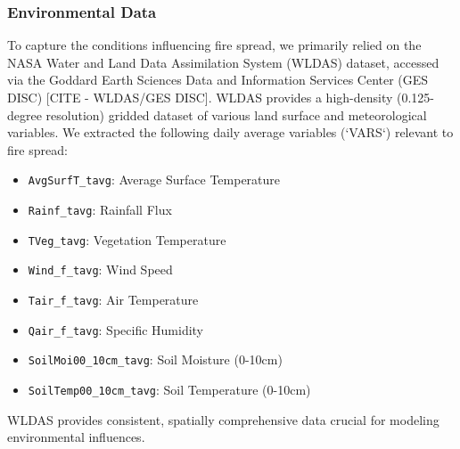 \documentclass[conference]{IEEEtran}
\begin{document}
\subsubsection{Environmental Data}
To capture the conditions influencing fire spread, we primarily relied on the NASA Water and Land Data Assimilation System (WLDAS) dataset, accessed via the Goddard Earth Sciences Data and Information Services Center (GES DISC) [CITE - WLDAS/GES DISC]. WLDAS provides a high-density (0.125-degree resolution) gridded dataset of various land surface and meteorological variables. We extracted the following daily average variables (`VARS`) relevant to fire spread:
\begin{itemize}
    \item \texttt{AvgSurfT\_tavg}: Average Surface Temperature
    \item \texttt{Rainf\_tavg}: Rainfall Flux
    \item \texttt{TVeg\_tavg}: Vegetation Temperature
    \item \texttt{Wind\_f\_tavg}: Wind Speed
    \item \texttt{Tair\_f\_tavg}: Air Temperature
    \item \texttt{Qair\_f\_tavg}: Specific Humidity
    \item \texttt{SoilMoi00\_10cm\_tavg}: Soil Moisture (0-10cm)
    \item \texttt{SoilTemp00\_10cm\_tavg}: Soil Temperature (0-10cm)
\end{itemize}
WLDAS provides consistent, spatially comprehensive data crucial for modeling environmental influences.
\end{document}
